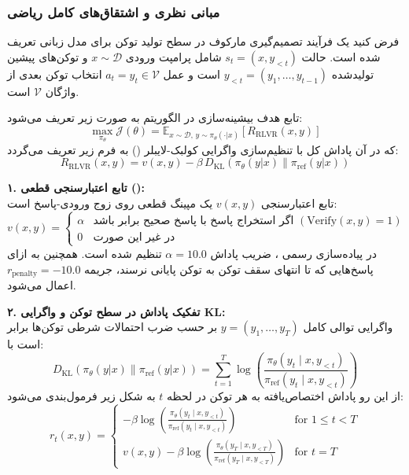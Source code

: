 \subsubsection*{مبانی نظری و اشتقاق‌های کامل ریاضی}

فرض کنید یک فرآیند تصمیم‌گیری مارکوف در سطح تولید توکن برای مدل زبانی تعریف شده است. حالت $s_t = (x, y_{<t})$ شامل پرامپت ورودی $x \sim \mathcal{D}$ و توکن‌های پیشین تولیدشده $y_{<t} = (y_1, \dots, y_{t-1})$ است و عمل $a_t = y_t \in \mathcal{V}$ انتخاب توکن بعدی از واژگان $\mathcal{V}$ است.

تابع هدف بیشینه‌سازی در الگوریتم  به صورت زیر تعریف می‌شود:
\begin{equation}
	\max_{\pi_\theta} \mathcal{J}(\theta) = \mathbb{E}_{x \sim \mathcal{D}, \, y \sim \pi_\theta(\cdot|x)} \left[ R_{\text{RLVR}}(x, y) \right]
\end{equation}
که در آن پاداش کل با تنظیم‌سازی واگرایی کولبک-لایبلر () به فرم زیر تعریف می‌گردد:
\begin{equation}
	R_{\text{RLVR}}(x, y) = v(x, y) - \beta \, D_{\text{KL}}\left(\pi_\theta(y|x) \parallel \pi_{\text{ref}}(y|x)\right)
\end{equation}

\textbf{۱. تابع اعتبارسنجی قطعی ():} \\
تابع اعتبارسنجی $v(x, y)$ یک مپینگ قطعی روی زوج ورودی-پاسخ است:
\begin{equation}
	v(x, y) = \begin{cases} 
		\alpha & \text{اگر استخراج پاسخ با پاسخ صحیح برابر باشد } (\text{Verify}(x, y) = 1) \\ 
		0 & \text{در غیر این صورت} 
	\end{cases}
\end{equation}
در پیاده‌سازی رسمی \cite{lambert2024tulu3}، ضریب پاداش $\alpha = 10.0$ تنظیم شده است. همچنین به ازای پاسخ‌هایی که تا انتهای سقف توکن به توکن پایانی  نرسند، جریمه $r_{\text{penalty}} = -10.0$ اعمال می‌شود.

\textbf{۲. تفکیک پاداش در سطح توکن و واگرایی KL:} \\
واگرایی  توالی کامل $y = (y_1, \dots, y_T)$ بر حسب ضرب احتمالات شرطی توکن‌ها برابر است با:
\begin{equation}
	D_{\text{KL}}(\pi_\theta(y|x) \parallel \pi_{\text{ref}}(y|x)) = \sum_{t=1}^T \log \left( \frac{\pi_\theta(y_t \mid x, y_{<t})}{\pi_{\text{ref}}(y_t \mid x, y_{<t})} \right)
\end{equation}
از این رو پاداش اختصاص‌یافته به هر توکن در لحظه $t$ به شکل زیر فرمول‌بندی می‌شود:
\begin{equation}
	r_t(x, y) = \begin{cases} 
		-\beta \log \left( \frac{\pi_\theta(y_t \mid x, y_{<t})}{\pi_{\text{ref}}(y_t \mid x, y_{<t})} \right) & \text{for } 1 \le t < T \\
		v(x, y) - \beta \log \left( \frac{\pi_\theta(y_T \mid x, y_{<T})}{\pi_{\text{ref}}(y_T \mid x, y_{<T})} \right) & \text{for } t = T
	\end{cases}
\end{equation}

